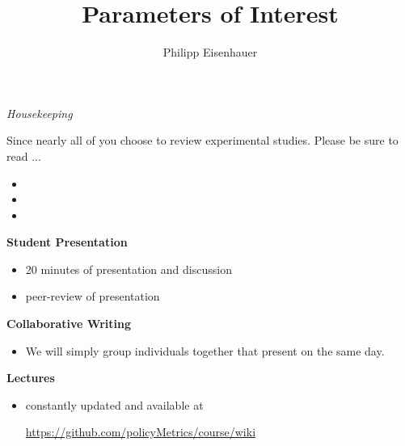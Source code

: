 

\title{Parameters of Interest}
\author{Philipp Eisenhauer}

\date{}

\let\otp\titlepage


\maketitle

\begin{frame}\begin{center}
\LARGE\textit{Housekeeping}
\end{center}\end{frame}
\begin{frame}
Since nearly all of you choose to review experimental studies. Please be sure to read ...

\begin{itemize}
\item {}
\item {}
\item {}
\end{itemize}
\end{frame}

\begin{frame}
\textbf{Student Presentation}
\begin{itemize}
\item 20 minutes of presentation and discussion
\item peer-review of presentation\vspace{0.5cm}
\end{itemize}

\textbf{Collaborative Writing}
\begin{itemize}
\item We will simply group individuals together that present on the same day.
\end{itemize}
\end{frame}

\begin{frame}

\textbf{Lectures}
\begin{itemize}
\item constantly updated and available at\vspace{0.2cm}
\begin{center}\url{https://github.com/policyMetrics/course/wiki}\end{center}
\end{itemize}
\end{frame}

